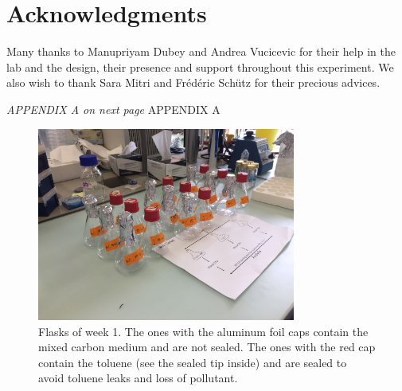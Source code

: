\documentclass[a4paper, 10pt, conference]{ieeeconf}   %
\begin{document}










\section*{Acknowledgments}
Many thanks to Manupriyam Dubey and Andrea Vucicevic for their help in the lab and the design, their presence and support throughout this experiment. We also wish to thank Sara Mitri and Frédéric Schütz for their precious advices. 



\printbibliography
\vspace*{\fill}
\textit{APPENDIX A on next page}
\clearpage
APPENDIX A

\begin{figure}[H]
	\includegraphics[width=8.5cm]{flasks.jpg}
	\caption{Flasks of week 1. The ones with the aluminum foil caps contain the mixed carbon medium and are not sealed. The ones with the red cap contain the toluene (see the sealed tip inside) and are sealed to avoid toluene leaks and loss of pollutant.}
	\label{flasks}
\end{figure}
\end{document}

